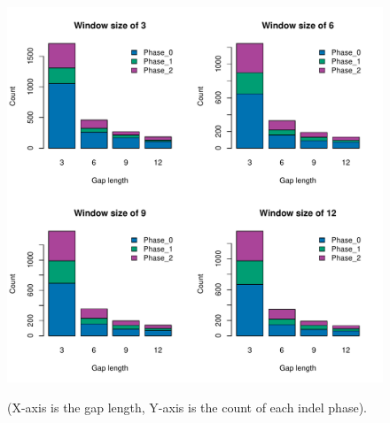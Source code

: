 \begin{figure}[H]
     \centering
     \begin{minipage}[t]{1\textwidth }
     \includegraphics[width=\linewidth, height=\linewidth]{Fig4.pdf}
     { {(X-axis is the gap length, Y-axis is the count of each indel phase).}
 \par}
     \end{minipage}
\end{figure}

